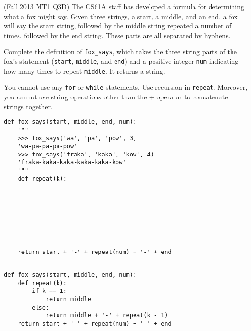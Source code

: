 \begin{blocksection}
\question (Fall 2013 MT1 Q3D) The CS61A staff has developed a formula for determining what a fox might say.
Given three strings, a start, a middle, and an end, a fox will say the start string, followed by the 
middle string repeated a number of times, followed by the end string. These parts are all separated by hyphens.

Complete the definition of \lstinline$fox_says$, which takes the three string parts of the fox's statement
(\lstinline$start$, \lstinline$middle$, and \lstinline$end$) and a positive integer \lstinline$num$ indicating
how many times to repeat \lstinline$middle$. It returns a string.

You cannot use any \lstinline$for$ or \lstinline$while$ statements. Use recursion in \lstinline$repeat$. Moreover,
you cannot use string operations other than the + operator to concatenate strings together.

\begin{lstlisting}
def fox_says(start, middle, end, num):
    """    
    >>> fox_says('wa', 'pa', 'pow', 3)
    'wa-pa-pa-pa-pow'
    >>> fox_says('fraka', 'kaka', 'kow', 4)
    'fraka-kaka-kaka-kaka-kaka-kow'
    """
    def repeat(k):
        
        
        
        
        
        
        
        
    return start + '-' + repeat(num) + '-' + end
    
\end{lstlisting}

\begin{solution}[1.5in]
\begin{lstlisting}
def fox_says(start, middle, end, num):
    def repeat(k):
        if k == 1:
            return middle
        else:
            return middle + '-' + repeat(k - 1)
    return start + '-' + repeat(num) + '-' + end
\end{lstlisting}
\end{solution}
\end{blocksection}
